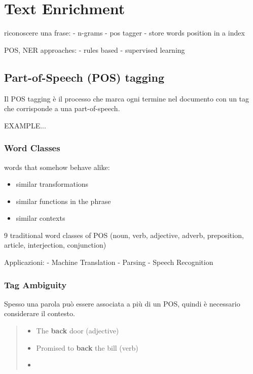 \chapter{Text Enrichment}

riconoscere una frase:
- n-grams
- pos tagger
- store words position in a index

POS, NER approaches:
- rules based
- supervised learning

\section{Part-of-Speech (POS) tagging}
Il POS tagging è il processo che marca ogni termine nel documento con un tag che corrisponde a una part-of-speech.

EXAMPLE...

\subsection*{Word Classes}
words that somehow behave alike:
\begin{itemize}
  \item similar transformations
  \item similar functions in the phrase
  \item similar contexts
\end{itemize}

9 traditional word classes of POS
(noun, verb, adjective, adverb, preposition, article, interjection, conjunction)

Applicazioni:
- Machine Translation
- Parsing
- Speech Recognition

\subsection*{Tag Ambiguity}
Spesso una parola può essere associata a più di un POS, quindi è necessario considerare il contesto.

\begin{quote}
  \bigskip
  \centering
  \begin{minipage}{0.8\linewidth}
    \begin{itemize}
      \item The \textbf{back} door \hfill{(adjective)}
      \item Promised to \textbf{back} the bill \hfill{(verb)}
      \item
    \end{itemize}
  \end{minipage}
  \bigskip
\end{quote}

